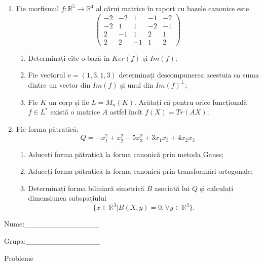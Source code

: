 \documentclass{article}
\begin{document}
\begin{enumerate}
 \item Fie morfismul $f:\mathbb{R}^5 \to \mathbb{R}^4$ al cărui matrice în raport cu bazele canonice este
$$\begin{pmatrix}
-2&-2&1&-1&-2\\
-2&1&1&-2&-1\\
2&-1&1&2&1\\
2&2&-1&1&2
\end{pmatrix}$$

\begin{enumerate}
\item Determinați cîte o bază în $Ker(f)$ și $Im(f)$;
\item Fie vectorul $v=(1,3,1,3)$ determinați descompunerea acestuia ca suma dintre un vector din $Im(f)$ și unul din $Im(f)^\perp$;
\item Fie $K$ un corp și fie $L=M_n(K)$. Arătați că pentru orice funcțională $f \in L^*$ există o matrice $A$ astfel încît $f(X)=Tr(AX)$;
\end{enumerate}
\item Fie forma pătratică:
$$Q= -x_1^2+x_2^2-5x_3^2+3x_1x_3+4x_2x_3$$

\begin{enumerate}
\item Aduceți forma pătratică la forma canonică prin metoda Gauss;
\item Aduceți forma pătratică la forma canonică prin transformări ortogonale;
\item Determinați forma biliniară simetrică $B$ asociată lui $Q$ și calculați dimensiunea subspațiului
$$\{x \in \mathbb{R}^3 | B(X,y)=0,\forall y \in \mathbb{R}^3\}.$$

\end{enumerate}
\end{enumerate}
\newpage
\begin{flushright}
Nume:\_\_\_\_\_\_\_\_\_\_\_\_\_\_
 
 
Grupa:\_\_\_\_\_\_\_\_\_\_\_\_\_\_
\end{flushright}
\begin{center}
\vspace{2cm}
{\Large Probleme}
\vspace{2cm}
\end{center}
\end{document}

